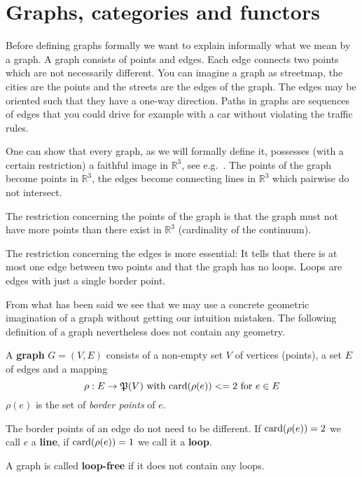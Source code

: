 \section{Graphs, categories and functors}

Before defining graphs formally we want to explain informally what we mean by a
graph. A graph consists of points and edges. Each edge connects two points which
are not necessarily different. You can imagine a graph as streetmap, the cities
are the points and the streets are the edges of the graph. The edges may be
oriented such that they have a one-way direction. Paths in graphs are sequences
of edges that you could drive for example with a car without violating the
traffic rules.

One can show that every graph, as we will formally define it, possesses (with a
certain restriction) a faithful image in $\mathbb{R}^3$, see e.g.\
\cite{Wagner}. The points of the graph become points in $\mathbb{R}^3$, the
edges become connecting lines in $\mathbb{R}^3$ which pairwise do not intersect.

The restriction concerning the points of the graph is that the graph must not
have more points than there exist in $\mathbb{R}^3$ (cardinality of the
continuum).

The restriction concerning the edges is more essential: It tells that there is
at most one edge between two points and that the graph has no loops. Loops are
edges with just a single border point.

From what has been said we see that we may use a concrete geometric imagination
of a graph without getting our intuition mistaken. The following definition of a
graph nevertheless does not contain any geometry.

\bigskip
\begin{definition}
A {\bf graph} $G = (V, E)$ consists of a non-empty set $V$ of vertices (points),
a set $E$ of edges and a mapping 
\[ \rho: E \to \mathfrak{P}({V})\text{ with }\mathrm{card}({\rho(e)}) <= 2\text{ for }e \in E \]
$\rho(e)$ is the set of {\em border points} of $e$.
\end{definition}

The border points of an edge do not need to be different. If $\mathrm{card}({\rho(e)}) =
2$ we call $e$ a {\bf line}, if $\mathrm{card}({\rho(e)}) = 1$ we call it a {\bf loop}.

\bigskip
\begin{definition}
A graph is called {\bf loop-free} if it does not contain any loops.
\end{definition}

